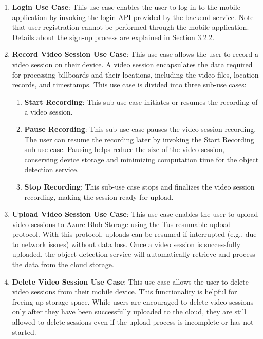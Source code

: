 \ifenglish
\begin{enumerate}
    \item \textbf{Login Use Case}: This use case enables the user to log in to the mobile application by invoking the login API provided by the backend service. Note that user registration cannot be performed through the mobile application. Details about the sign-up process are explained in Section 3.2.2. %
    \item \textbf{Record Video Session Use Case}: This use case allows the user to record a video session on their device. A video session encapsulates the data required for processing billboards and their locations, including the video files, location records, and timestamps. This use case is divided into three sub-use cases:  
    \begin{enumerate}
        \item \textbf{Start Recording}: This sub-use case initiates or resumes the recording of a video session.  
        \item \textbf{Pause Recording}: This sub-use case pauses the video session recording. The user can resume the recording later by invoking the Start Recording sub-use case. Pausing helps reduce the size of the video session, conserving device storage and minimizing computation time for the object detection service.  
        \item \textbf{Stop Recording}: This sub-use case stops and finalizes the video session recording, making the session ready for upload.  
    \end{enumerate}
    \item \textbf{Upload Video Session Use Case}: This use case enables the user to upload video sessions to Azure Blob Storage using the Tus resumable upload protocol. With this protocol, uploads can be resumed if interrupted (e.g., due to network issues) without data loss. Once a video session is successfully uploaded, the object detection service will automatically retrieve and process the data from the cloud storage.  
    \item \textbf{Delete Video Session Use Case}: This use case allows the user to delete video sessions from their mobile device. This functionality is helpful for freeing up storage space. While users are encouraged to delete video sessions only after they have been successfully uploaded to the cloud, they are still allowed to delete sessions even if the upload process is incomplete or has not started.  
\end{enumerate}
